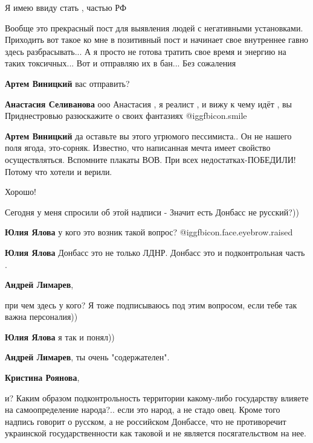 \begin{itemize}
\begin{itemize}
Я имею ввиду стать , частью РФ


Вообще это прекрасный пост для выявления людей с негативными установками.
Приходить вот такое ко мне в позитивный пост и начинает свое внутреннее гавно
здесь разбрасывать... А я просто не готова тратить свое время и энергию на
таких токсичных... Вот и отправляю их в бан... Без сожаления

\textbf{Артем Виницкий} вас отправить?

\textbf{Анастасия Селиванова} ооо Анастасия , я реалист , и вижу к чему идёт , вы Приднестровью разюскажите о своих фантазиях  @igg{fbicon.smile} 

\textbf{Артем Виницкий} да оставьте вы этого угрюмого пессимиста.. Он не нашего поля ягода, это-сорняк. Известно, что написанная мечта имеет свойство осуществляться. Вспомните плакаты ВОВ. При всех недостатках-ПОБЕДИЛИ! Потому что хотели и верили.
\end{itemize} %

Хорошо!

Сегодня у меня спросили об этой надписи - Значит есть Донбасс не русский?))

\begin{itemize} %
\textbf{Юлия Ялова} у кого это возник такой вопрос?  @igg{fbicon.face.eyebrow.raised} 

\textbf{Юлия Ялова} Донбасс это не только ЛДНР. Донбасс это и подконтрольная часть .

\textbf{Андрей Лимарев}, 

при чем здесь у кого? Я тоже подписываюсь под этим вопросом, если тебе так
важна персоналия))

\textbf{Юлия Ялова} я так и понял))

\textbf{Андрей Лимарев}, ты очень "содержателен".

\textbf{Кристина Роянова}, 

и? Каким образом подконтрольность территории какому-либо государству влияете на
самоопределение народа?.. если это народ, а не стадо овец. Кроме того надпись
говорит о русском, а не российском Донбассе, что не противоречит украинской
государственности как таковой и не является посягательством на нее.


\end{itemize}
\end{itemize}
